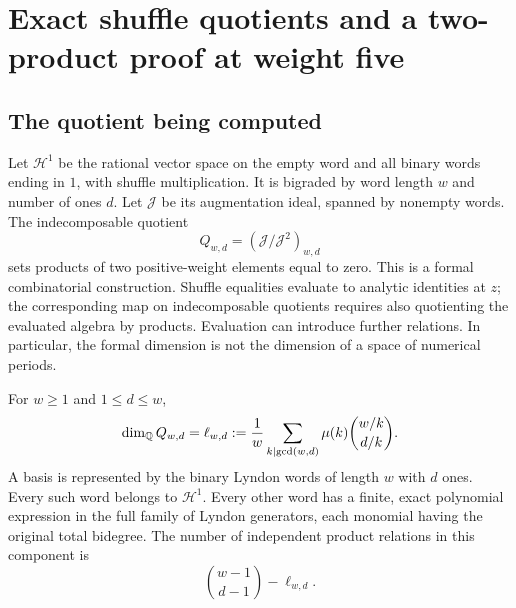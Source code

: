 \section{Exact shuffle quotients and a two-product proof at weight five}
\label{gaussian:sec:shuffle}

\subsection{The quotient being computed}

Let \(\mathcal H^1\) be the rational vector space on the empty word
and all binary words ending in \(1\), with shuffle multiplication.
It is bigraded by word length \(w\) and number of ones \(d\).
Let \(\mathcal J\) be its augmentation ideal, spanned by nonempty
words. The indecomposable quotient
\[
Q_{w,d}=(\mathcal J/\mathcal J^2)_{w,d}
\]
sets products of two positive-weight elements equal to zero.
This is a formal combinatorial construction. Shuffle equalities evaluate
to analytic identities at \(z\); the corresponding map on indecomposable
quotients requires also quotienting the evaluated algebra by products.
Evaluation can introduce further relations. In particular, the formal
dimension is not the dimension of a space of numerical periods.

\begin{theorem}\label{gaussian:thm:witt}
For \(w\ge1\) and \(1\le d\le w\),
\[
\dim_{\mathbb{Q}}Q_{w,d}
=\ell_{w,d}
:=\frac1w\sum_{k\mid\gcd(w,d)}
\mu(k)\binom{w/k}{d/k}.
\]
A basis is represented by the binary Lyndon words of length \(w\)
with \(d\) ones. Every such word belongs to \(\mathcal H^1\).
Every other word has a finite, exact polynomial expression in the full
family of Lyndon generators, each monomial having the original total
bidegree. The number of independent product relations in
this component is
\[
\binom{w-1}{d-1}-\ell_{w,d}.
\]
\end{theorem}

